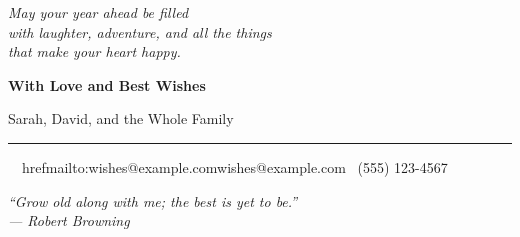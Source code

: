 \documentclass[
    language=english,
    doctype=greeting-card,
    institution=none,
]{../../omnilatex}
\begin{document}
\begin{center}
    \vspace{2cm}

    {\large\itshape May your year ahead be filled\\
    with laughter, adventure, and all the things\\
    that make your heart happy.}

    \vspace{1.5cm}

    {\Large\bfseries\color{purple!60!black}%
    With Love and Best Wishes}

    \vspace{0.8cm}

    {\Large Sarah, David, and the Whole Family}

    \vspace{1cm}

    \noindent\rule{0.4\textwidth}{0.5pt}

    \vspace{1.5cm}

    {\small\color{gray!60!black}%
    \faEnvelope\ \ href{mailto:wishes@example.com}{wishes@example.com}%
    \qquad
    \faPhone\ (555) 123-4567}

    \vspace{1cm}

    {\small\itshape\color{gray!50!black}%
    ``Grow old along with me; the best is yet to be.''\\
    --- Robert Browning}

\end{center}
\end{document}
